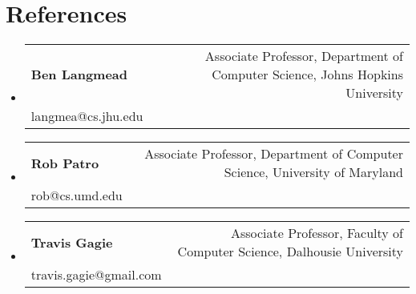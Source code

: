 \documentclass[A4,11pt]{article}
\makeatletter
\newcommand{\CVSubheading}[4]{
  \vspace{-2pt}\item
    \begin{tabular*}{0.97\textwidth}[t]{l@{\extracolsep{\fill}}r}
      \textbf{#1} & #2 \\
      \small#3 & \small #4 \\
    \end{tabular*}\vspace{-7pt}
}
\newcommand{\CVSubHeadingListStart}{\begin{itemize}[leftmargin=0.5cm, label={}]}
\newcommand{\CVSubHeadingListEnd}{\end{itemize}}
\makeatother
\begin{document}
\begin{comment}
\section{Community Involvement}
  \CVSubHeadingListStart
    \CVSubheading
      {Austin College Community Tutors}{Fall 2017 -- Fall 2018}
      {Free tutoring for local students in science and mathematics}{Sherman, TX}
    \CVSubheading
      {River Legacy Nature Center}{September 2015 -- August 2016}
      {Provided assistance for various youth science education programs}{Arlington, TX}
    \CVSubheading
      {Back on My Feet Run Club}{April 2014 -- August 2015}
      {Helping to reestablish homeless persons in the community}{Austin, TX}
  \CVSubHeadingListEnd
\end{comment}
\begin{comment}
This section is compressed from the various skills sections that Euro CV
recommends.
\end{comment}

    

\section{References}
\CVSubHeadingListStart
  \CVSubheading
    {Ben Langmead}{Associate Professor, Department of Computer Science, Johns Hopkins University}
    {langmea@cs.jhu.edu}{}
  \CVSubheading
    {Rob Patro}{Associate Professor, Department of Computer Science, University of Maryland}
    {rob@cs.umd.edu}{ }
  \CVSubheading
    {Travis Gagie}{Associate Professor, Faculty of Computer Science, Dalhousie University}
    {travis.gagie@gmail.com}{ }
\CVSubHeadingListEnd
\end{document}
